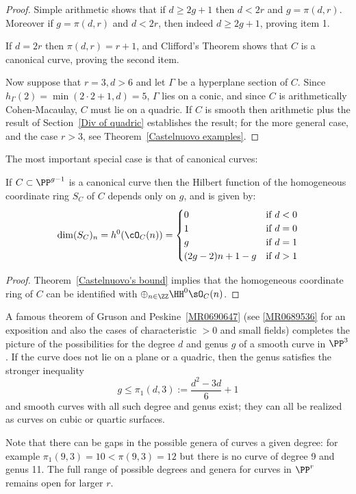 \begin{proof}
Simple arithmetic shows that if $d\geq 2g+1$  then  $d<2r$ and $g= \pi(d,r)$. Moreover if $g= \pi(d,r)$ and $d<2r$,
then indeed $d\geq 2g+1$, proving item 1.

If $d= 2r$ then $\pi(d,r) = r+1$, and Clifford's Theorem shows that $C$ is a canonical curve, proving the second
item.

Now suppose that $r=3, d>6$ and let $\Gamma$ be a hyperplane 
section of $C$. Since $h_{\Gamma}(2) = \min(2\cdot 2+1, d) = 5$, $\Gamma$ lies on a conic, and 
since $C$ is arithmetically Cohen-Macaulay, $C$ must lie on a quadric. 
If $C$ is smooth then arithmetic plus the result of Section~\ref{Div of quadric} establishes the result; for the more general case,
and the case $r>3$, see Theorem~\ref{Castelnuovo examples}.
\end{proof}
The most important special case is that of canonical curves:

 \begin{corollary}\label{canonical hilbert function}
If $C\subset \PP^{g-1}$ is a canonical curve then the Hilbert function of the homogeneous coordinate ring $S_{C}$ of  $C$ depends only on $g$, and is given by:
$$
\dim({S_{C}})_{n} = h^{0}(\cO_{C}(n)) = 
\begin{cases}
 0 &\mbox {if } d<0\\
 1 & \mbox {if }  d=0\\
 g & \mbox {if }  d=1\\
 (2g-2)n + 1 - g & \mbox {if }  d>1\\
\end{cases}
$$
\end{corollary}
\begin{proof}
Theorem~\ref{Castelnuovo's bound} implies that the homogeneous coordinate ring of $C$ can be identified with $\oplus_{n\in \ZZ}\HH^0\sO_C(n)$.  
\end{proof}


\begin{fact}
A famous theorem of Gruson and Peskine~\ref{MR0690647} (see \ref{MR0689536} for an exposition and also the cases of characteristic $>0$ and small fields) completes the picture of the possibilities for the degree $d$ and  genus $g$  of a smooth curve in $\PP^3$. If the curve does not lie on a plane or a quadric, then the genus satisfies the stronger inequality
$$
g\leq \pi_1(d,3) := \frac{d^2-3d}{6} +1
$$
and smooth curves with all such degree and genus exist; they can all be realized as curves
on cubic or quartic surfaces.

Note that there can be gaps in the possible genera of curves a given degree: for example  $\pi_1(9,3) = 10<\pi(9,3) =12$ but there is
no curve of degree 9 and genus 11. 
The full range of possible degrees and genera for curves in $\PP^r$ remains open for larger $r$. 
\end{fact}



